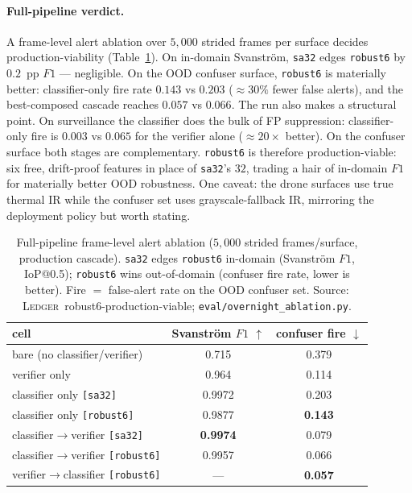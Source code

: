 \paragraph{Full-pipeline verdict.}
A frame-level alert ablation over $5{,}000$ strided frames per surface decides production-viability (Table~\ref{tab:robust6_pipeline}). On in-domain Svanstr\"om, \texttt{sa32} edges \texttt{robust6} by $0.2$~pp $F1$ --- negligible. On the OOD confuser surface, \texttt{robust6} is materially better: classifier-only fire rate $0.143$ vs $0.203$ (${\approx}30\%$ fewer false alerts), and the best-composed cascade reaches $0.057$ vs $0.066$. The run also makes a structural point. On surveillance the classifier does the bulk of FP suppression: classifier-only fire is $0.003$ vs $0.065$ for the verifier alone (${\approx}20\times$ better). On the confuser surface both stages are complementary. \texttt{robust6} is therefore production-viable: six free, drift-proof features in place of \texttt{sa32}'s $32$, trading a hair of in-domain $F1$ for materially better OOD robustness. One caveat: the drone surfaces use true thermal IR while the confuser set uses grayscale-fallback IR, mirroring the deployment policy but worth stating.

\begin{table}[htbp]
    \centering
    \caption{Full-pipeline frame-level alert ablation ($5{,}000$ strided frames/surface, production cascade). \texttt{sa32} edges \texttt{robust6} in-domain (Svanstr\"om $F1$, IoP@0.5); \texttt{robust6} wins out-of-domain (confuser fire rate, lower is better). Fire $=$ false-alert rate on the OOD confuser set. Source: \textsc{Ledger}~robust6-production-viable; \texttt{eval/overnight\_ablation.py}.}
    \label{tab:robust6_pipeline}
    \begin{tabular}{lcc}
        \toprule
        cell & Svanstr\"om $F1$ $\uparrow$ & confuser fire $\downarrow$ \\
        \midrule
        bare (no classifier/verifier)        & 0.715 & 0.379 \\
        verifier only                        & 0.964 & 0.114 \\
        classifier only \texttt{[sa32]}      & 0.9972 & 0.203 \\
        classifier only \texttt{[robust6]}   & 0.9877 & \textbf{0.143} \\
        classifier$\to$verifier \texttt{[sa32]}    & \textbf{0.9974} & 0.079 \\
        classifier$\to$verifier \texttt{[robust6]} & 0.9957 & 0.066 \\
        verifier$\to$classifier \texttt{[robust6]} & --- & \textbf{0.057} \\
        \bottomrule
    \end{tabular}
\end{table}


